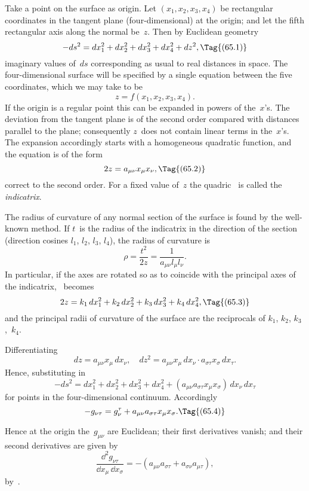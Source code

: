 \documentclass[12pt]{book}
\begin{document}
Take a point on the surface as origin. Let $(x_{1}, x_{2}, x_{3}, x_{4})$ be rectangular
coordinates in the tangent plane (four-dimensional) at the origin; and let the
fifth rectangular axis along the normal be~$z$. Then by Euclidean geometry
\[
-ds^{2} = dx_{1}^{2} + dx_{2}^{2} + dx_{3}^{2} + dx_{4}^{2} + dz^{2},
\Tag{(65.1)}
\]
imaginary values of~$ds$ corresponding as usual to real distances in space. The
four-dimensional surface will be specified by a single equation between the
five coordinates, which we may take to be
\[
z = f(x_{1}, x_{2}, x_{3}, x_{4}).
\]
If the origin is a regular point this can be expanded in powers of the~$x$'s. The
deviation from the tangent plane is of the second order compared with distances
parallel to the plane; consequently $z$~does not contain linear terms in
the~$x$'s. The expansion accordingly starts with a homogeneous quadratic
function, and the equation is of the form
\[
2z = a_{\mu\nu} x_{\mu} x_{\nu},
\Tag{(65.2)}
\]
correct to the second order. For a fixed value of~$z$ the quadric~ is called
the \emph{indicatrix}.
%

The radius of curvature of any normal section of the surface is found by
the well-known method. If $t$~is the radius of the indicatrix in the direction of
the section (direction cosines $l_{1}$, $l_{2}$, $l_{3}$, $l_{4}$), the radius of curvature is
\[
\rho = \frac{t^{2}}{2z} = \frac{1}{a_{\mu\nu} l_{\mu} l_{\nu}}.
\]
In particular, if the axes are rotated so as to coincide with the principal axes
of the indicatrix, ~becomes
\[
2z = k_{1}\, dx_{1}^{2} + k_{2}\, dx_{2}^{2} + k_{3}\, dx_{3}^{2} + k_{4}\, dx_{4}^{2},
\Tag{(65.3)}
\]
and the principal radii of curvature of the surface are the reciprocals of
$k_{1}$, $k_{2}$, $k_{3}$,~$k_{4}$.

Differentiating~
\[
dz = a_{\mu\nu} x_{\mu}\, dx_{\nu},\quad
dz^{2} = a_{\mu\nu} x_{\mu}\, dx_{\nu} \cdot a_{\sigma\tau} x_{\sigma}\, dx_{\tau}.
\]
Hence, substituting in~
\[
-ds^{2} = dx_{1}^{2} + dx_{2}^{2} + dx_{3}^{2} + dx_{4}^{2}
+ (a_{\mu\nu} a_{\sigma\tau} x_{\mu} x_{\sigma})\, dx_{\nu}\, dx_{\tau}
\]
for points in the four-dimensional continuum. Accordingly
\[
-g_{\nu\tau} = g_{\nu}^{\tau} + a_{\mu\nu} a_{\sigma\tau} x_{\mu} x_{\sigma}.
\Tag{(65.4)}
\]

Hence at the origin the~$g_{\mu\nu}$ are Euclidean; their first derivatives vanish;
and their second derivatives are given by
\[
\frac{\dd^{2} g_{\nu\tau}}{\dd x_{\mu}\, \dd x_{\sigma}}
= -(a_{\mu\nu} a_{\sigma\tau} + a_{\sigma\nu} a_{\mu\tau}),
\]
by~.
\end{document}
